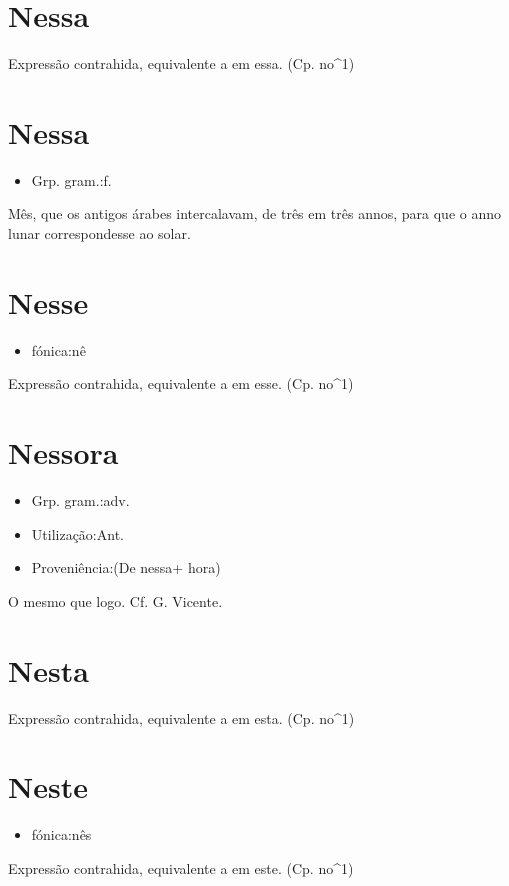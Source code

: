 \section{Nessa}
Expressão contrahida, equivalente a \textunderscore em essa\textunderscore .
(Cp. \textunderscore no\textunderscore ^1)
\section{Nessa}
\begin{itemize}
\item {Grp. gram.:f.}
\end{itemize}
Mês, que os antigos árabes intercalavam, de três em três annos, para que o anno lunar correspondesse ao solar.
\section{Nesse}
\begin{itemize}
\item {fónica:nê}
\end{itemize}
Expressão contrahida, equivalente a \textunderscore em esse\textunderscore .
(Cp. \textunderscore no\textunderscore ^1)
\section{Nessora}
\begin{itemize}
\item {Grp. gram.:adv.}
\end{itemize}
\begin{itemize}
\item {Utilização:Ant.}
\end{itemize}
\begin{itemize}
\item {Proveniência:(De \textunderscore nessa\textunderscore  + \textunderscore hora\textunderscore )}
\end{itemize}
O mesmo que \textunderscore logo\textunderscore . Cf. G. Vicente.
\section{Nesta}
Expressão contrahida, equivalente a \textunderscore em esta\textunderscore .
(Cp. \textunderscore no\textunderscore ^1)
\section{Neste}
\begin{itemize}
\item {fónica:nês}
\end{itemize}
Expressão contrahida, equivalente a \textunderscore em este\textunderscore .
(Cp. \textunderscore no\textunderscore ^1)
